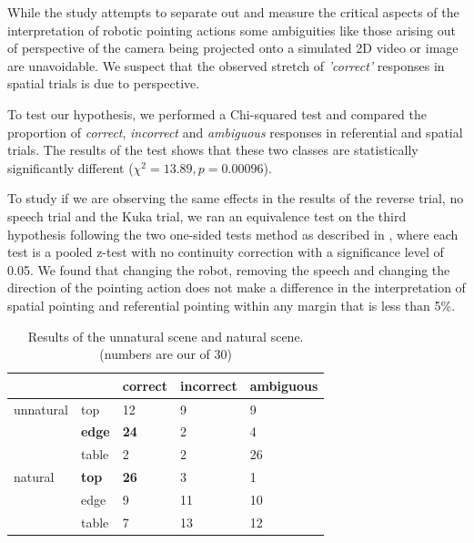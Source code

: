 While the study attempts to separate out and measure the critical aspects of the interpretation of robotic pointing actions some ambiguities like those arising out of perspective of the camera being projected onto a simulated 2D video or image are unavoidable. We suspect that the observed stretch of \textit{'correct'} responses in spatial trials is due to perspective.

To test our hypothesis, we performed a Chi-squared test and compared the proportion of \textit{correct}, \textit{incorrect} and \textit{ambiguous} responses in referential and spatial trials. The results of the test shows that these two classes are statistically significantly different ($\chi^2= 13.89, p = 0.00096$).

To study if we are observing the same effects in the results of the reverse trial, no speech trial and the Kuka trial, we ran an equivalence test on the third hypothesis following the two one-sided tests method as described in \cite{lakens2017equivalence}, where each test is a pooled z-test with no continuity
correction with a significance level of 0.05. We found that changing the robot, removing the speech and changing the direction of the pointing action does not make a difference in the interpretation of spatial pointing and referential pointing within any margin that is less than 5\%.


\begin{table}[h]
\label{tab:naturaltrial}
\begin{tabular}{lllll}
          &               & correct     & incorrect & ambiguous \\ \hline
unnatural & top           & 12          & 9         & 9         \\
          & \textbf{edge} & \textbf{24} & 2         & 4         \\
          & table         & 2           & 2         & 26        \\ \hline
natural   & \textbf{top}  & \textbf{26} & 3         & 1         \\
          & edge          & 9           & 11        & 10        \\
          & table         & 7           & 13        & 12        \\ \hline
\end{tabular}
\caption{Results of the unnatural scene and natural scene. (numbers are our of 30) }
\label{tab:natural-unnatural}
\end{table}

